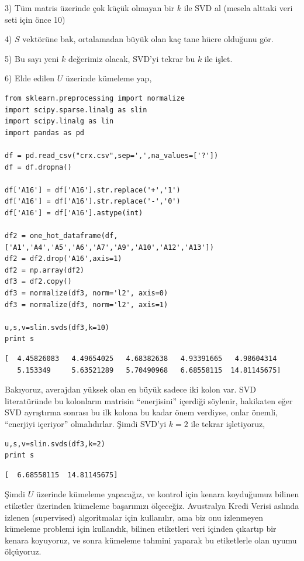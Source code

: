 \documentclass[12pt,fleqn]{article}\usepackage{../../common}
\begin{document}
3) Tüm matris üzerinde çok küçük olmayan bir $k$ ile SVD al (mesela alttaki
veri seti için önce 10)

4) $S$ vektörüne bak, ortalamadan büyük olan kaç tane hücre olduğunu gör.

5) Bu sayı yeni $k$ değerimiz olacak, SVD'yi tekrar bu $k$ ile işlet. 

6) Elde edilen $U$ üzerinde kümeleme yap,

\begin{verbatim}
from sklearn.preprocessing import normalize
import scipy.sparse.linalg as slin
import scipy.linalg as lin
import pandas as pd

df = pd.read_csv("crx.csv",sep=',',na_values=['?'])
df = df.dropna()

df['A16'] = df['A16'].str.replace('+','1')
df['A16'] = df['A16'].str.replace('-','0')
df['A16'] = df['A16'].astype(int)

df2 = one_hot_dataframe(df,['A1','A4','A5','A6','A7','A9','A10','A12','A13'])
df2 = df2.drop('A16',axis=1)
df2 = np.array(df2)
df3 = df2.copy()
df3 = normalize(df3, norm='l2', axis=0)
df3 = normalize(df3, norm='l2', axis=1)

u,s,v=slin.svds(df3,k=10)
print s
\end{verbatim}

\begin{verbatim}
[  4.45826083   4.49654025   4.68382638   4.93391665   4.98604314
   5.153349     5.63521289   5.70490968   6.68558115  14.81145675]
\end{verbatim}

Bakıyoruz, averajdan yüksek olan en büyük sadece iki kolon var. SVD
literatüründe bu kolonların matrisin ``enerjisini'' içerdiği söylenir,
hakikaten eğer SVD ayrıştırma sonrası bu ilk kolona bu kadar önem verdiyse,
onlar önemli, ``enerjiyi içeriyor'' olmalıdırlar. Şimdi SVD'yi $k=2$ ile
tekrar işletiyoruz,

\begin{verbatim}
u,s,v=slin.svds(df3,k=2)
print s
\end{verbatim}

\begin{verbatim}
[  6.68558115  14.81145675]
\end{verbatim}

Şimdi $U$ üzerinde kümeleme yapacağız, ve kontrol için kenara koyduğumuz
bilinen etiketler üzerinden kümeleme başarımızı ölçeceğiz. Avustralya Kredi
Verisi aslında izlenen (supervised) algoritmalar için kullanılır, ama biz
onu izlenmeyen kümeleme problemi için kullandık, bilinen etiketleri veri
içinden çıkartıp bir kenara koyuyoruz, ve sonra kümeleme tahmini yaparak bu
etiketlerle olan uyumu ölçüyoruz. 
\end{document}
